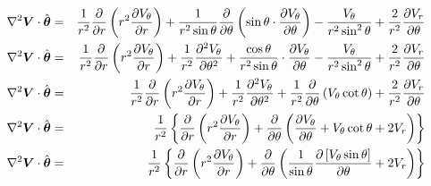 \begin{eqnarray}
\nabla^2 \boldsymbol{V} \cdot \hat{\boldsymbol{\theta}} &=&
\frac{1}{r^2}\frac{\partial }{\partial r}\left( r^2 \frac{\partial V_\theta}{\partial r} \right) + \frac{1}{r^2 \sin\theta} \frac{\partial }{\partial \theta} \left( \sin\theta \cdot \frac{\partial V_\theta}{\partial \theta}\right)
 - \frac{V_\theta}{r^2 \sin^2\theta} + \frac{2}{r^2}\frac{\partial V_r}{\partial \theta}
\\
\nabla^2 \boldsymbol{V} \cdot \hat{\boldsymbol{\theta}} &=&
\frac{1}{r^2}\frac{\partial }{\partial r}\left( r^2 \frac{\partial V_\theta}{\partial r} \right)
+ \frac{1}{r^2} \frac{\partial ^2 V_\theta}{\partial \theta^2}
+ \frac{\cos\theta}{r^2 \sin\theta} \cdot \frac{\partial V_\theta}{\partial \theta}
 - \frac{V_\theta}{r^2 \sin^2\theta} + \frac{2}{r^2}\frac{\partial V_r}{\partial \theta}
\\
\nabla^2 \boldsymbol{V} \cdot \hat{\boldsymbol{\theta}} &=&
\frac{1}{r^2}\frac{\partial }{\partial r}\left( r^2 \frac{\partial V_\theta}{\partial r} \right)
+ \frac{1}{r^2} \frac{\partial ^2 V_\theta}{\partial \theta^2}
+ \frac{1}{r^2} \frac{\partial }{\partial \theta}
                 \left(V_\theta \cot\theta\right)
 + \frac{2}{r^2}\frac{\partial V_r}{\partial \theta}
\\
\nabla^2 \boldsymbol{V} \cdot \hat{\boldsymbol{\theta}} &=& \frac{1}{r^2} \left\{
\frac{\partial }{\partial r}\left( r^2 \frac{\partial V_\theta}{\partial r} \right)
+ \frac{\partial }{\partial \theta} \left(\frac{\partial V_\theta}{\partial \theta}
+ V_\theta \cot\theta + 2V_r \right) \right\}
\\
\nabla^2 \boldsymbol{V} \cdot \hat{\boldsymbol{\theta}} &=& \frac{1}{r^2} \left\{
\frac{\partial }{\partial r}\left( r^2 \frac{\partial V_\theta}{\partial r} \right)
+ \frac{\partial }{\partial \theta} \left( \frac{1}{\sin\theta}
\frac{\partial \left[V_\theta \sin\theta\right]}{\partial \theta}
+ 2V_r \right) \right\}
\end{eqnarray}

